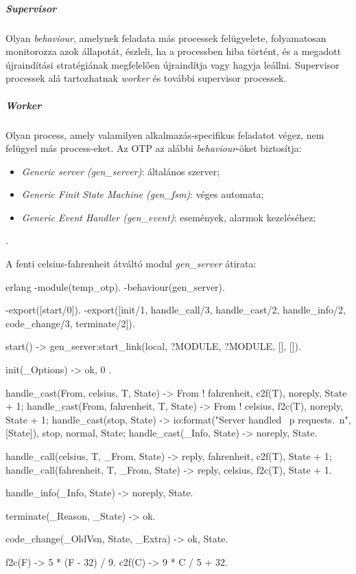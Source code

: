 \documentclass[12pt, a4paper, oneside]{book}
\begin{document}
\subparagraph{Supervisor} Olyan \emph{behaviour}, amelynek feladata más processek
felügyelete, folyamatosan monitorozza azok állapotát, észleli, ha
a processben hiba történt, és a megadott újraindítási stratégiának megfelelően
újraindítja vagy hagyja leállni. Supervisor processek alá tartozhatnak
\emph{worker} és további supervisor processek.

\subparagraph{Worker} Olyan process, amely valamilyen alkalmazás-specifikus
feladatot végez, nem felügyel más process-eket. Az OTP az alábbi
\emph{behaviour}-öket biztosítja:
\begin{itemize}
\item \emph{Generic server (gen\_server)}: általános szerver;
\item \emph{Generic Finit State Machine (gen\_fsm)}: véges automata;
\item \emph{Generic Event Handler (gen\_event)}: események, alarmok kezeléséhez;
\end{itemize}

\citep{OTPInAction}.

\newpage
A fenti celsius-fahrenheit átváltó modul \emph{gen\_server} átirata:

\begin{code}{erlang}{}
-module(temp_otp).
-behaviour(gen_server).

-export([start/0]).
-export([init/1, handle_call/3, handle_cast/2, 
         handle_info/2, code_change/3, terminate/2]).

start() ->
  gen_server:start_link({local, ?MODULE}, ?MODULE, [], []).

init(_Options) ->
  {ok, 0 }.

handle_cast({From, celsius, T}, State) ->
  From ! {fahrenheit, c2f(T)},
  {noreply, State + 1};
handle_cast({From, fahrenheit, T}, State) ->
  From ! {celsius, f2c(T)},
  {noreply, State + 1};
handle_cast(stop, State) ->
  io:format("Server handled ~p requests.~n", [State]),
  {stop, normal, State};
handle_cast(_Info, State) ->
  {noreply, State}.

handle_call({celsius, T}, _From, State) ->
  {reply, {fahrenheit, c2f(T)}, State + 1};
handle_call({fahrenheit, T}, _From, State) ->
  {reply, {celsius, f2c(T)}, State + 1}.

handle_info(_Info, State) ->
  {noreply, State}.

terminate(_Reason, _State) ->
  ok.

code_change(_OldVsn, State, _Extra) ->
  {ok, State}.

f2c(F) ->
  5 * (F - 32) / 9.
c2f(C) ->
  9 * C / 5 + 32.
\end{code}
\end{document}
